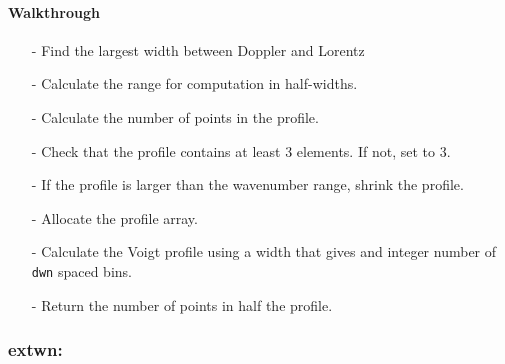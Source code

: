 \documentclass[letterpaper,12pt]{article}
\begin{document}
\paragraph{Walkthrough}
\begin{enumerate}[leftmargin=10pt, noitemsep, parsep=0pt, topsep=0ex]
\item[-] Find the largest width between Doppler and Lorentz
\item[-] Calculate the range for computation in half-widths.
\item[-] Calculate the number of points in the profile.
\item[-] Check that the profile contains at least 3 elements. If not, set to 3.
\item[-] If the profile is larger than the wavenumber range, shrink the profile.
\item[-] Allocate the profile array.
\item[-] Calculate the Voigt profile using a width that gives and integer number of {\tt dwn} spaced bins.
\item[-] Return the number of points in half the profile.
\end{enumerate}


\subsubsection{extwn:}
\end{document}
